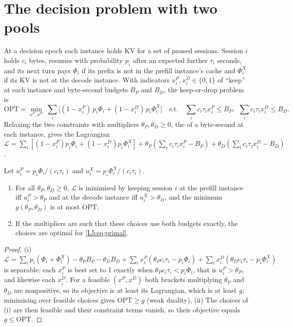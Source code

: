 \section{The decision problem with two pools}\label{L5:sec:decision}

At a decision epoch each instance holds KV for a set of paused sessions. Session $i$
holds $c_i$ bytes, resumes with probability $p_i$ after an expected further $\tau_i$
seconds, and its next turn pays $\Phi_i$ if its prefix is not in the prefill instance's
cache and $\Phi^X_i$ if its KV is not at the decode instance. With indicators
$x^P_i,x^D_i\in\{0,1\}$ of ``keep'' at each instance and byte-second budgets $B_P$ and
$B_D$, the keep-or-drop problem is
\begin{equation}\label{L5:eq:primal}
  \mathrm{OPT}=\min_{x^P,x^D}\ \sum_i\bigl[(1-x^P_i)\,p_i\Phi_i+(1-x^D_i)\,p_i\Phi^X_i\bigr]
  \quad\text{s.t.}\quad \sum_ic_i\tau_ix^P_i\le B_P,\ \ \sum_ic_i\tau_ix^D_i\le B_D .
\end{equation}
Relaxing the two constraints with multipliers $\theta_P,\theta_D\ge0$, the
 of a byte-second at each instance, gives the Lagrangian
$\mathcal{L}=\sum_i[(1-x^P_i)p_i\Phi_i+(1-x^D_i)p_i\Phi^X_i]
+\theta_P(\sum_ic_i\tau_ix^P_i-B_P)+\theta_D(\sum_ic_i\tau_ix^D_i-B_D)$.

\begin{proposition}\label{L5:prop:shadow}
Let $u^P_i=p_i\Phi_i/(c_i\tau_i)$ and $u^X_i=p_i\Phi^X_i/(c_i\tau_i)$.
\begin{enumerate}[label=(\roman*)]
\item For all $\theta_P,\theta_D\ge0$, $\mathcal{L}$ is minimised by keeping session $i$ at
  the prefill instance iff $u^P_i>\theta_P$ and at the decode instance iff
  $u^X_i>\theta_D$, and the minimum $g(\theta_P,\theta_D)$ is at most $\mathrm{OPT}$.
\item If the multipliers are such that these choices use both budgets exactly, the
  choices are optimal for \eqref{L5:eq:primal}.
\end{enumerate}
\end{proposition}

\begin{proof}
(i) $\mathcal{L}=\sum_ip_i(\Phi_i+\Phi^X_i)-\theta_PB_P-\theta_DB_D
+\sum_ix^P_i(\theta_Pc_i\tau_i-p_i\Phi_i)+\sum_ix^D_i(\theta_Dc_i\tau_i-p_i\Phi^X_i)$ is
separable: each $x^P_i$ is best set to 1 exactly when $\theta_Pc_i\tau_i<p_i\Phi_i$, that
is $u^P_i>\theta_P$, and likewise each $x^D_i$. For a feasible $(x^P,x^D)$ both brackets
multiplying $\theta_P$ and $\theta_D$ are nonpositive, so its objective is at least its
Lagrangian, which is at least $g$; minimising over feasible choices gives
$\mathrm{OPT}\ge g$ (weak duality). (ii) The choices of (i) are then feasible and their
constraint terms vanish, so their objective equals $g\le\mathrm{OPT}$.
\end{proof}

